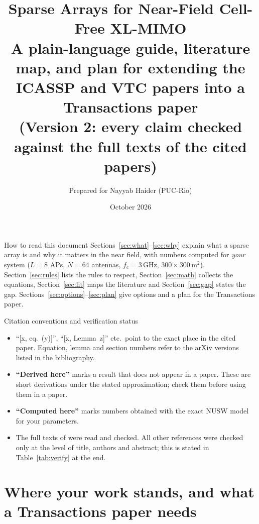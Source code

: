 \documentclass[11pt]{article}
\title{\textbf{Sparse Arrays for Near-Field Cell-Free XL-MIMO}\\[2pt]
\large A plain-language guide, literature map, and plan for extending the ICASSP and VTC papers into a Transactions paper\\[2pt]
\normalsize (Version 2: every claim checked against the full texts of the cited papers)}
\author{Prepared for Nayyab Haider (PUC-Rio)}
\date{October 2026}
\begin{document}
\maketitle

\begin{keybox}{How to read this document}
Sections~\ref{sec:what}--\ref{sec:why} explain what a sparse array is and why it matters in the near field, with numbers computed for \emph{your} system ($L=8$ APs, $N=64$ antennas, $f_c=3$\,GHz, $300\times300$\,m$^2$).
Section~\ref{sec:rules} lists the rules to respect, Section~\ref{sec:math} collects the equations, Section~\ref{sec:lit} maps the literature and Section~\ref{sec:gap} states the gap.
Sections~\ref{sec:options}--\ref{sec:plan} give options and a plan for the Transactions paper.
\end{keybox}

\begin{warnbox}{Citation conventions and verification status}
\begin{itemize}[leftmargin=*]
  \item ``[x, eq.~(y)]'', ``[x, Lemma~z]'' etc.\ point to the exact place in the cited paper. Equation, lemma and section numbers refer to the arXiv versions listed in the bibliography.
  \item \textbf{``Derived here''} marks a result that does not appear in a paper. These are short derivations under the stated approximation; check them before using them in a paper.
  \item \textbf{``Computed here''} marks numbers obtained with the exact NUSW model for your parameters.
  \item The full texts of \cite{bjornson2021primer,chen2025exploring,chen2024nearfield,zhou2025sparse,wang2024sparsemimo,hussain2026thinning,li2023modular,kosasih2025mla,wang2026combining} were read and checked. All other references were checked only at the level of title, authors and abstract; this is stated in Table~\ref{tab:verify} at the end.
\end{itemize}
\end{warnbox}

\tableofcontents
\newpage

\section{Where your work stands, and what a Transactions paper needs}
\label{sec:context}
\end{document}
